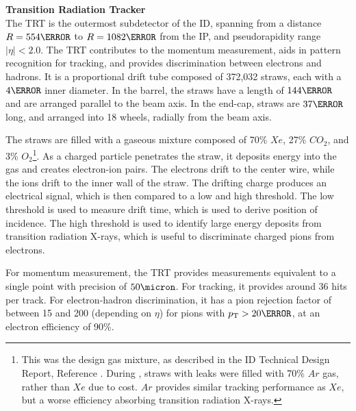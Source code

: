 \noindent\textbf{Transition Radiation Tracker}\\
\indent The \gls{TRT} is the outermost subdetector of the \gls{ID}, spanning from a distance $R=\unit{554}{\mm}$ to $R= \unit{1082}{\mm}$ from the \gls{IP}, and pseudorapidity range $|\eta| < 2.0$. The \gls{TRT} contributes to the momentum measurement, aids in pattern recognition for tracking, and provides discrimination between electrons and hadrons. It is a proportional drift tube composed of 372,032 straws, each with a $\unit{4}{\mm}$ inner diameter. In the barrel, the straws have a length of $\unit{144}{\cm}$ and are arranged parallel to the beam axis. In the end-cap, straws are $\unit{37}{\cm}$ long, and arranged into 18 wheels, radially from the beam axis.

The straws are filled with a gaseous mixture composed of 70\% $Xe$, 27\% $CO_2$, and 3\% $O_2$\footnote{This was the design gas mixture, as described in the \gls{ID} Technical Design Report, Reference \cite{inner-detector-tdr}. During \RunTwo, straws with leaks were filled with 70\% $Ar$ gas, rather than $Xe$ due to cost. $Ar$ provides similar tracking performance as $Xe$, but a worse efficiency absorbing transition radiation X-rays.}. As a charged particle penetrates the straw, it deposits energy into the gas and creates electron-ion pairs. The electrons drift to the center wire, while the ions drift to the inner wall of the straw. The drifting charge produces an electrical signal, which is then compared to a low and high threshold. The low threshold is used to measure drift time, which is used to derive position of incidence. The high threshold is used to identify large energy deposits from transition radiation X-rays, which is useful to discriminate charged pions from electrons.

For momentum measurement, the \gls{TRT} provides measurements equivalent to a single point with precision of $\unit{50}{\micron}$. For tracking, it provides around 36 hits per track. For electron-hadron discrimination, it has a pion rejection factor of between 15 and 200 (depending on $\eta$) for pions with $\pt > \unit{20}{\GeV}$, at an electron efficiency of 90\%.



